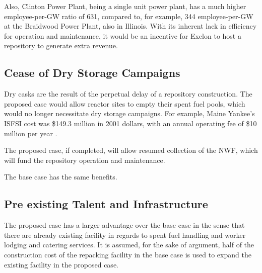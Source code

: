 Also, Clinton Power Plant, being a single unit power plant, has a much higher
 employee-per-GW ratio of 631, compared to, for example, 344 employee-per-GW at
the Braidwood Power Plant, also in Illinois. %
With its inherent lack in efficiency for operation and maintenance, it would be
an incentive for Exelon to host a repository to generate extra revenue. 

 
\subsection{Cease of Dry Storage Campaigns}

Dry casks are the result of the perpetual delay of a repository construction.
The proposed case would allow reactor sites to empty their spent fuel pools, which
would no longer necessitate dry storage campaigns. For example, Maine Yankee's 
\gls{ISFSI} cost was \$149.3 million in 2001 dollars, with an annual operating fee
of \$10 million per year \cite{IAEA_2009}. 

The proposed case, if completed, will allow resumed collection of the \gls{NWF}, 
which will fund the repository operation and maintenance.

The base case has the same benefits.



\subsection{Pre existing Talent and Infrastructure }

%

The proposed case has a larger advantage over the base case in the sense that there
are already existing facility in regards to spent fuel handling and worker lodging 
and catering services. 
It is assumed, for the sake of argument, half of the construction cost of the
repacking facility in the base case is used to expand the existing facility in the
proposed case. 

